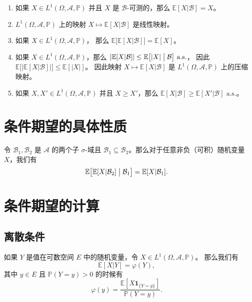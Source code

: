 \documentclass[fontset=none]{Notes}
\newcommand{\indicator}[1]{\mathbold 1_{#1}}
\newcommand{\alsu}[1]{\text{$#1$ a.s.}}
\begin{document}
\begin{proposition}[条件期望的性质]
  \mbox{}
  \begin{enumerate}
    \item 如果 $X\in L^1(\Omega,\mathcal{A},\mathbb{P})$
    并且 $X$ 是 $\mathcal{B}$-可测的，那么
    $\mathbb{E}[X|\mathcal{B}]=X$。
    \item $L^1(\Omega,\mathcal{A},\mathbb{P})$
    上的映射 $X\mapsto \mathbb{E}[X| \mathcal{B}]$
    是线性映射。
    \item 如果 $X\in L^1(\Omega,\mathcal{A},\mathbb{P})$，
    那么 $\mathbb{E}\bigl[\mathbb{E}[X| \mathcal{B}]\bigr]=\mathbb{E}[X]$。
    \item 如果 $X\in L^1(\Omega,\mathcal{A},\mathbb{P})$，那么
    $|\mathbb{E}[X|\mathcal{B}]|\leq \mathbb{E}\bigl[|X|\bigm| \mathcal{B}\bigr]\alsu{}$，
    因此 $\mathbb{E}\bigl[\bigl|\mathbb{E}[X|\mathcal{B}]\bigr|\bigr]\leq \mathbb{E}[|X|]$。
    因此映射 $X\mapsto \mathbb{E}[X|\mathcal{B}]$ 是 $L^1(\Omega,\mathcal{A},\mathbb{P})$
    上的压缩映射。
    \item 如果 $X,X'\in L^1(\Omega,\mathcal{A},\mathbb{P})$ 并且
    $X\geq X'$，那么 $\mathbb{E}[X|\mathcal{B}]\geq \mathbb{E}[X'|\mathcal{B}]\alsu{}$。
  \end{enumerate}
\end{proposition}

\section{条件期望的具体性质}

\begin{proposition}[嵌套 $\sigma$-域]\label{prop:nested sigma field}
  令 $\mathcal{B}_1,\mathcal{B}_2$ 是 $\mathcal{A}$ 的两个子 $\sigma$-域且
  $\mathcal{B}_1\subseteq \mathcal{B}_2$。那么对于任意非负（可积）随机变量 $X$，我们有
  \[
    \mathbb{E}\bigl[\mathbb{E}[X|\mathcal{B}_2]\bigm| \mathcal{B}_1\bigr]=
    \mathbb{E}[X|\mathcal{B}_1].
  \]
\end{proposition}


\section{条件期望的计算}

\subsection{离散条件}

如果 $Y$ 是值在可数空间 $E$ 中的随机变量，令 $X\in L^1(\Omega,\mathcal{A},\mathbb{P})$。
那么我们有
\[
  \mathbb{E}[X|Y]=\varphi(Y),  
\]
其中 $y\in E$ 且 $\mathbb{P}(Y=y)>0$ 的时候有
\[
  \varphi(y)=\frac{\mathbb{E}[X\indicator{\{Y=y\}}]}{\mathbb{P}(Y=y)}.
\]
\end{document}
